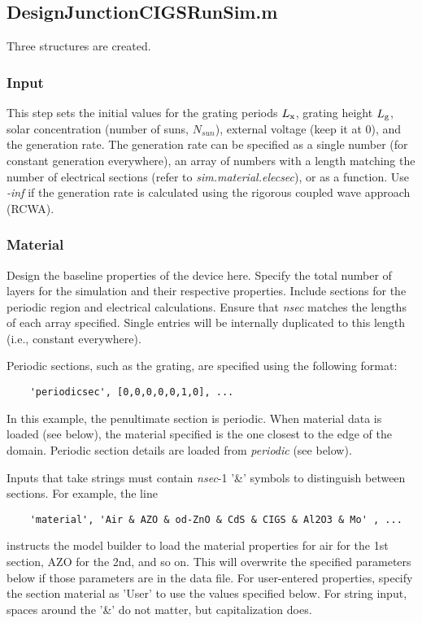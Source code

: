 \documentclass[10pt]{article}
\def\Lg{L_{\rm g}}
\def\Lx{L_{\rm x}}
\def\Nsun{N_{sun}}
\def\Lg{L_{\rm g}}
\def\Lx{L_{\rm x}}
\begin{document}
\subsection{DesignJunctionCIGSRunSim.m}
Three structures are created. 

\subsubsection{Input}
This step sets the initial values for the grating periods $\Lx$, grating height $\Lg$, solar concentration (number of suns, $\Nsun$), external voltage (keep it at 0), and the generation rate. The generation rate can be specified as a single number (for constant generation everywhere), an array of numbers with a length matching the number of electrical sections (refer to \emph{sim.material.elecsec}), or as a function. Use \emph{-inf} if the generation rate is calculated using the rigorous coupled wave approach (RCWA).
  

\subsubsection{Material}
Design the baseline properties of the device here. Specify the total number of layers for the simulation and their respective properties. Include sections for the periodic region and electrical calculations. Ensure that \emph{nsec} matches the lengths of each array specified. Single entries will be internally duplicated to this length (i.e., constant everywhere).

Periodic sections, such as the grating, are specified using the following format:
\begin{verbatim}
	'periodicsec', [0,0,0,0,0,1,0], ...
\end{verbatim}
In this example, the penultimate section is periodic. When material data is loaded (see below), the material specified is the one closest to the edge of the domain. Periodic section details are loaded from \emph{periodic} (see below).

Inputs that take strings must contain \emph{nsec}-1 '\&' symbols to distinguish between sections. For example, the line
\begin{verbatim}
	'material', 'Air & AZO & od-ZnO & CdS & CIGS & Al2O3 & Mo' , ... 
\end{verbatim}
instructs the model builder to load the material properties for air for the 1st section, AZO for the 2nd, and so on. This will overwrite the specified parameters below if those parameters are in the data file. For user-entered properties, specify the section material as 'User' to use the values specified below. For string input, spaces around the '\&' do not matter, but capitalization does.
\end{document}

